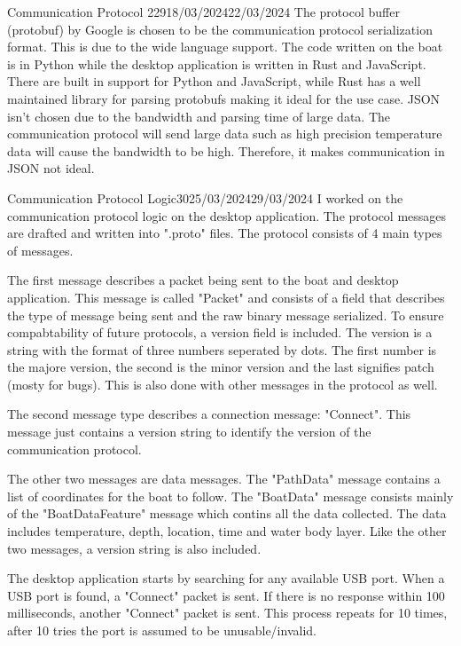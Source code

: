 \documentclass[12pt]{article}
\begin{document}
\begin{logbook-entry}{Communication Protocol 2}{29}{18/03/2024}{22/03/2024}
The protocol buffer (protobuf) by Google is chosen to be the communication protocol serialization format.
This is due to the wide language support.
The code written on the boat is in Python while the desktop application is written in Rust and JavaScript.
There are built in support for Python and JavaScript, while Rust has a well maintained library for parsing protobufs making it ideal for the use case.
JSON isn't chosen due to the bandwidth and parsing time of large data.
The communication protocol will send large data such as high precision temperature data will cause the bandwidth to be high.
Therefore, it makes communication in JSON not ideal.
\end{logbook-entry}

\begin{logbook-entry}{Communication Protocol Logic}{30}{25/03/2024}{29/03/2024}
I worked on the communication protocol logic on the desktop application.
The protocol messages are drafted and written into ".proto" files.
The protocol consists of 4 main types of messages.

The first message describes a packet being sent to the boat and desktop application.
This message is called "Packet" and consists of a field that describes the type of message being sent and the raw binary message serialized.
To ensure compabtability of future protocols, a version field is included.
The version is a string with the format of three numbers seperated by dots.
The first number is the majore version, the second is the minor version and the last signifies patch (mosty for bugs).
This is also done with other messages in the protocol as well.

The second message type describes a connection message: "Connect".
This message just contains a version string to identify the version of the communication protocol.

The other two messages are data messages.
The "PathData" message contains a list of coordinates for the boat to follow.
The "BoatData" message consists mainly of the "BoatDataFeature" message which contins all the data collected.
The data includes temperature, depth, location, time and water body layer.
Like the other two messages, a version string is also included.

The desktop application starts by searching for any available USB port.
When a USB port is found, a "Connect" packet is sent.
If there is no response within 100 milliseconds, another "Connect" packet is sent.
This process repeats for 10 times, after 10 tries the port is assumed to be unusable/invalid.


\end{logbook-entry}
\end{document}
